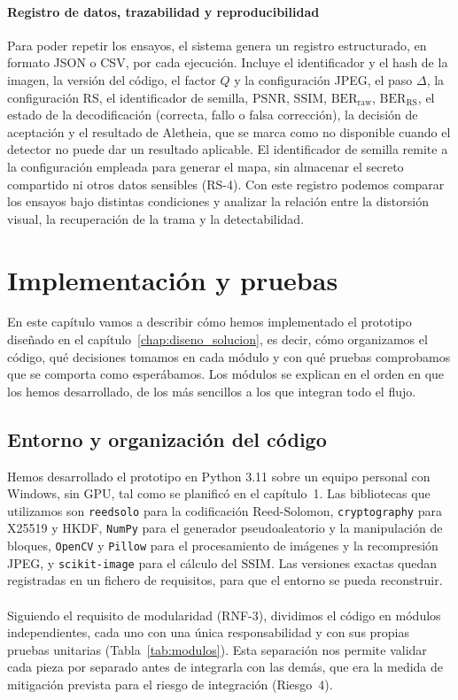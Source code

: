 \documentclass[IB]{TFUOC}%
\begin{document}
\subsubsection{Registro de datos, trazabilidad y reproducibilidad}

Para poder repetir los ensayos, el sistema genera un registro estructurado, en formato JSON o CSV, por cada ejecución. Incluye el identificador y el hash de la imagen, la versión del código, el factor $Q$ y la configuración JPEG, el paso $\Delta$, la configuración RS, el identificador de semilla, $\mathrm{PSNR}$, $\mathrm{SSIM}$, $\mathrm{BER}_{\mathrm{raw}}$, $\mathrm{BER}_{\mathrm{RS}}$, el estado de la decodificación (correcta, fallo o falsa corrección), la decisión de aceptación y el resultado de Aletheia, que se marca como no disponible cuando el detector no puede dar un resultado aplicable. El identificador de semilla remite a la configuración empleada para generar el mapa, sin almacenar el secreto compartido ni otros datos sensibles (RS-4). Con este registro podemos comparar los ensayos bajo distintas condiciones y analizar la relación entre la distorsión visual, la recuperación de la trama y la detectabilidad.


 
\chapter{Implementación y pruebas}
\label{chap:implementacion}

En este capítulo vamos a describir cómo hemos implementado el prototipo diseñado en el capítulo~\ref{chap:diseno_solucion}, es decir, cómo organizamos el código, qué decisiones tomamos en cada módulo 
y con qué pruebas comprobamos que se comporta como esperábamos. Los módulos se explican en el orden en que los hemos desarrollado, de los más sencillos a los que integran todo el flujo.

\section{Entorno y organización del código}
\label{sec:entorno_codigo}

Hemos desarrollado el prototipo en Python 3.11 sobre un equipo personal con Windows, sin GPU, tal como se planificó en el capítulo~1. Las bibliotecas que utilizamos son \texttt{reedsolo} para la codificación Reed-Solomon, \texttt{cryptography} para X25519 y HKDF, \texttt{NumPy} para el generador pseudoaleatorio y la manipulación de bloques, \texttt{OpenCV} y \texttt{Pillow} para el procesamiento de imágenes y la recompresión JPEG, y \texttt{scikit-image} para el cálculo del $\mathrm{SSIM}$. Las versiones exactas quedan registradas en un fichero de requisitos, para que el entorno se pueda reconstruir.
\\
\\
Siguiendo el requisito de modularidad (RNF-3), dividimos el código en módulos independientes, cada uno con una única responsabilidad y con sus propias pruebas unitarias (Tabla~\ref{tab:modulos}). Esta separación nos permite validar cada pieza por separado antes de integrarla con las demás, que era la medida de mitigación prevista para el riesgo de integración (Riesgo~4).
\end{document}
